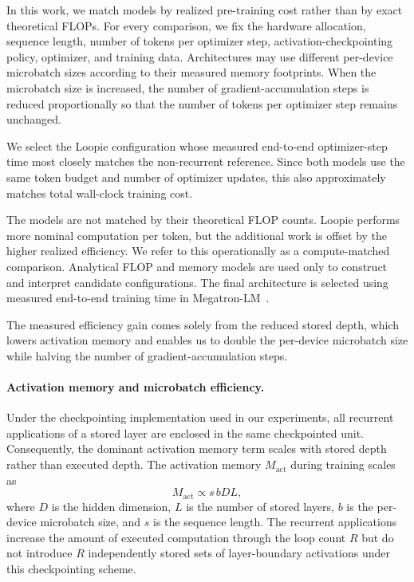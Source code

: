 In this work, we match models by realized pre-training cost rather than by exact theoretical FLOPs. For every comparison, we fix the hardware allocation, sequence length, number of tokens per optimizer step, activation-checkpointing policy, optimizer, and training data. Architectures may use different per-device microbatch sizes according to their measured memory footprints. When the microbatch size is increased, the number of gradient-accumulation steps is reduced proportionally so that the number of tokens per optimizer step remains unchanged.

We select the Loopie configuration whose measured end-to-end optimizer-step time most closely matches the non-recurrent reference. Since both models use the same token budget and number of optimizer updates, this also approximately matches total wall-clock training cost.

The models are not matched by their theoretical FLOP counts. Loopie performs more nominal computation per token, but the additional work is offset by the higher realized efficiency. We refer to this operationally as a compute-matched comparison. Analytical FLOP and memory models are used only to construct and
interpret candidate configurations. The final architecture is selected
using measured end-to-end training time in Megatron-LM~\citep{megatron-lm}.

The measured efficiency gain comes solely from the reduced stored depth, which lowers activation memory and enables us to double the per-device microbatch size while halving the number of gradient-accumulation steps.

\paragraph{Activation memory and microbatch efficiency.}
Under the checkpointing implementation used in our experiments, all
recurrent applications of a stored layer are enclosed in the same
checkpointed unit. Consequently, the dominant activation memory term
scales with stored depth rather than executed depth. The activation memory $M_{\mathrm{act}}$ during training scales as~\citep{MLSYS2023_80083951,3433701.3433727}
\[
M_{\mathrm{act}}
\propto
s\,bDL,
\]
where $D$ is the hidden dimension, $L$ is the number of stored layers,
$b$ is the per-device microbatch size, and $s$ is the sequence
length. The recurrent applications increase the amount of executed computation through the loop count $R$ but do not introduce $R$ independently stored sets of layer-boundary activations under this checkpointing scheme.

